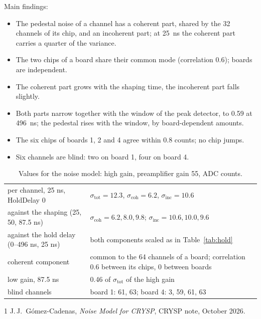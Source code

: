 \documentclass[11pt,a4paper]{article}
\begin{document}
Main findings:
\begin{itemize}
\item The pedestal noise of a channel has a coherent part, shared by the 32 channels of its
  chip, and an incoherent part; at 25~ns the coherent part carries a quarter of the variance.
\item The two chips of a board share their common mode (correlation 0.6); boards are
  independent.
\item The coherent part grows with the shaping time, the incoherent part falls slightly.
\item Both parts narrow together with the window of the peak detector, to 0.59 at 496~ns; the
  pedestal rises with the window, by board-dependent amounts.
\item The six chips of boards 1, 2 and 4 agree within 0.8 counts; no chip jumps.
\item Six channels are blind: two on board 1, four on board 4.
\end{itemize}

\begin{table}[H]
\centering
\small
\begin{tabular}{lp{}}
\toprule
per channel, 25 ns, HoldDelay 0 & $\sigma_\mathrm{tot} = 12.3$, $\sigma_\mathrm{coh} = 6.2$, $\sigma_\mathrm{inc} = 10.6$ \\
against the shaping (25, 50, 87.5 ns) & $\sigma_\mathrm{coh} = 6.2, 8.0, 9.8$; $\sigma_\mathrm{inc} = 10.6, 10.0, 9.6$ \\
against the hold delay (0--496 ns, 25 ns) & both components scaled as in Table~\ref{tab:hold} \\
coherent component & common to the 64 channels of a board; correlation 0.6 between its chips, 0 between boards \\
low gain, 87.5 ns & 0.46 of $\sigma_\mathrm{tot}$ of the high gain \\
blind channels & board 1: 61, 63; board 4: 3, 59, 61, 63 \\
\bottomrule
\end{tabular}
\caption{Values for the noise model: high gain, preamplifier gain 55, ADC counts.}
\label{tab:values}
\end{table}

\begin{thebibliography}{1}
 J.\,J.~Gómez-Cadenas, \emph{Noise Model for CRYSP}, CRYSP note,
  October 2026.
\end{thebibliography}
\end{document}
